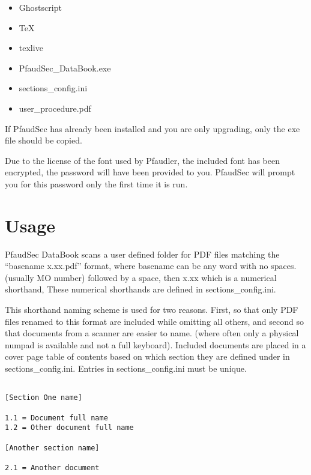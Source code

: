 \documentclass[14pt]{article}
\newcommand{\ifolder}{\item[\faFolderOpen]}
\newcommand{\ifile}{\item[\faFileText]}
\begin{document}
\begin{flushleft}
\begin{enumerate}
\begin{tcolorbox}[boxrule=0.5pt, colback=backgrey, colframe=bordergrey, sharpish corners]
\begin{itemize}[labelsep = 1.5em, align=center]

\ifolder Ghostscript
\ifolder TeX
\ifolder texlive
\ifile PfaudSec\_DataBook.exe
\ifile sections\_config.ini
\ifile user\_procedure.pdf

\end{itemize}
\end{tcolorbox}

If PfaudSec has already been installed and you are only upgrading, only the exe file should be copied.

Due to the license of the font used by Pfaudler, the included font has been encrypted, the password will have been provided to you.
PfaudSec will prompt you for this password only the first time it is run.


\end{enumerate}

\section{Usage}
\setlength{\parindent}{0.2in}
PfaudSec DataBook scans a user defined folder for PDF files matching the ``basename x.xx.pdf''
format, where basename can be any word with no spaces. (usually MO number) followed by a space, then x.xx which is a numerical shorthand,
These numerical shorthands are defined in sections\_config.ini.

This shorthand naming scheme is used for two reasons. First, so that only PDF files renamed to this format are included while omitting all others, and second so that documents from a scanner are easier to name.
(where often only a physical numpad is available and not a full keyboard).
Included documents are placed in a cover page table of contents based on which section they are defined under in sections\_config.ini.
Entries in sections\_config.ini must be unique.

\begin{tcolorbox}[
coltitle=black, title=\centering Example sections\_config.ini,
boxrule=0.5pt, colback=backgrey, colframe=bordergrey, sharpish corners] 
\begin{verbatim}

[Section One name]

1.1 = Document full name
1.2 = Other document full name

[Another section name]

2.1 = Another document

\end{verbatim}
\end{tcolorbox}


\end{flushleft}
\end{document}
